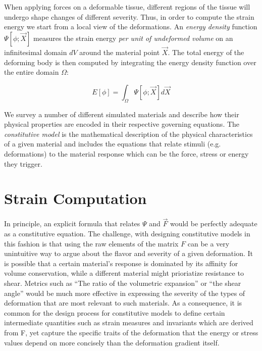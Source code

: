 When applying forces on a deformable tissue, different regions of the tissue will undergo shape changes of different severity. Thus, in order to compute the 
strain energy we start from a local view of the deformations. An \textit{energy density} function $\Psi[\phi; \vec{X}]$ measures the strain energy 
\textit{per unit of undeformed volume} on an infinitesimal domain $dV$ around the material point $\vec{X}$. The total energy of the deforming body is then 
computed by integrating the energy density function over the entire domain $\Omega$:

\begin{equation}
  E[\phi]=\int_\Omega\Psi[\phi;\vec{X}]d\vec{X}
\end{equation}


We survey a number of different simulated materials and describe how their physical properties are encoded in their respective governing equations. The 
\textit{constitutive model} is the mathematical description of the physical characteristics of a given material and includes the equations that relate
stimuli (e.g. deformations) to the material response which can be the force, stress or energy they trigger. 

\section{Strain Computation}
In principle, an explicit formula that relates $\Psi$ and $\vec{F}$ would be perfectly adequate as a constitutive equation. The challenge, with designing
constitutive models in this fashion is that using the raw elements of the matrix $F$ can be a very unintuitive way to argue about the flavor and severity
of a given deformation. It is possible that a certain material's response is dominated by its affinity for volume conservation, while a different material
might prioriatize resistance to shear. Metrics such as ``The ratio of the volumetric expansion'' or ``the shear angle'' would be much more effective in 
expressing the severity of the types of deformation that are most relevant to such materials. As a consequence, it is common for the design process for 
constitutive models to define certain intermediate quantities such as strain measures and invariants which are derived from F, yet capture the specific 
traits of the deformation that the energy or stress values depend on more concisely than the deformation gradient itself.


